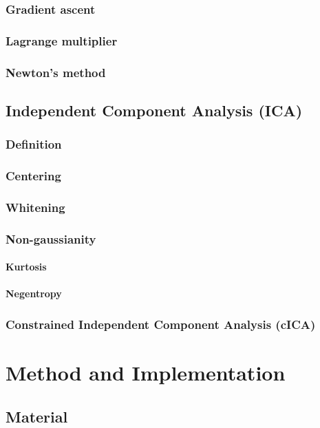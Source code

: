 \documentclass{report}
\begin{document}
\subsection{Gradient ascent}
\subsection{Lagrange multiplier}
\subsection{Newton's method}


\section{Independent Component Analysis (ICA)}
\subsection{Definition}
\subsection{Centering}
\subsection{Whitening}
\subsection{Non-gaussianity}
\subsubsection{Kurtosis}
\subsubsection{Negentropy}


\subsection{Constrained Independent Component Analysis (cICA)}


\chapter{Method and Implementation}

\section{Material}
\end{document}
